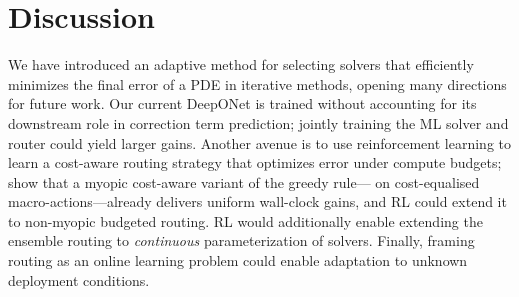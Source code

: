 \documentclass{article}
\newcommand{\edit}[1]{{\color{red}#1}}
\begin{document}
\section{Discussion} \label{sec:discussion}

We have introduced an adaptive method for selecting solvers that efficiently minimizes the final error of a PDE in iterative methods, opening many directions for future work. Our current DeepONet is trained without accounting for its downstream role in correction term prediction; jointly training the ML solver and router could yield larger gains. Another avenue is to use reinforcement learning to learn a cost-aware routing strategy that optimizes error under compute budgets\edit{;  show that a myopic cost-aware variant of the greedy rule---\Cref{alg:greedy} on cost-equalised macro-actions---already delivers uniform wall-clock gains, and RL could extend it to non-myopic budgeted routing}. RL would additionally enable extending the ensemble routing to \textit{continuous} parameterization of solvers. Finally, framing routing as an online learning problem could enable adaptation to unknown deployment conditions. 








\appendix

\end{document}
